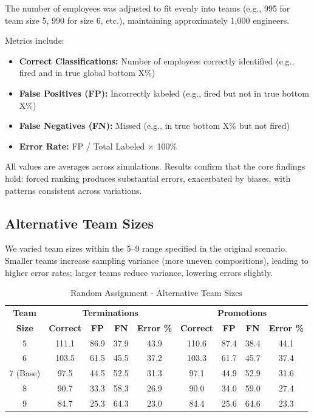 \documentclass[12pt]{article}
\begin{document}
The number of employees was adjusted to fit evenly into teams (e.g., 995 for team size 5, 990 for size 6, etc.), maintaining approximately 1,000 engineers.

Metrics include:
\begin{itemize}
\item \textbf{Correct Classifications:} Number of employees correctly identified (e.g., fired and in true global bottom X\%)
\item \textbf{False Positives (FP):} Incorrectly labeled (e.g., fired but not in true bottom X\%)
\item \textbf{False Negatives (FN):} Missed (e.g., in true bottom X\% but not fired)
\item \textbf{Error Rate:} FP / Total Labeled $\times$ 100\%
\end{itemize}

All values are averages across simulations. Results confirm that the core findings hold: forced ranking produces substantial errors, exacerbated by biases, with patterns consistent across variations.

\subsection{Alternative Team Sizes}

We varied team sizes within the 5--9 range specified in the original scenario. Smaller teams increase sampling variance (more uneven compositions), leading to higher error rates; larger teams reduce variance, lowering errors slightly.

\begin{table}[h]
\centering
\caption{Random Assignment - Alternative Team Sizes}
\label{tab:sens-teamsize-random}
\small
\begin{tabular}{ccccccccc}
\toprule
\textbf{Team} & \multicolumn{4}{c}{\textbf{Terminations}} & \multicolumn{4}{c}{\textbf{Promotions}} \\
\textbf{Size} & \textbf{Correct} & \textbf{FP} & \textbf{FN} & \textbf{Error \%} & \textbf{Correct} & \textbf{FP} & \textbf{FN} & \textbf{Error \%} \\
\midrule
5 & 111.1 & 86.9 & 37.9 & 43.9 & 110.6 & 87.4 & 38.4 & 44.1 \\
6 & 103.5 & 61.5 & 45.5 & 37.2 & 103.3 & 61.7 & 45.7 & 37.4 \\
7 (Base) & 97.5 & 44.5 & 52.5 & 31.3 & 97.1 & 44.9 & 52.9 & 31.6 \\
8 & 90.7 & 33.3 & 58.3 & 26.9 & 90.0 & 34.0 & 59.0 & 27.4 \\
9 & 84.7 & 25.3 & 64.3 & 23.0 & 84.4 & 25.6 & 64.6 & 23.3 \\
\bottomrule
\end{tabular}
\end{table}
\end{document}
